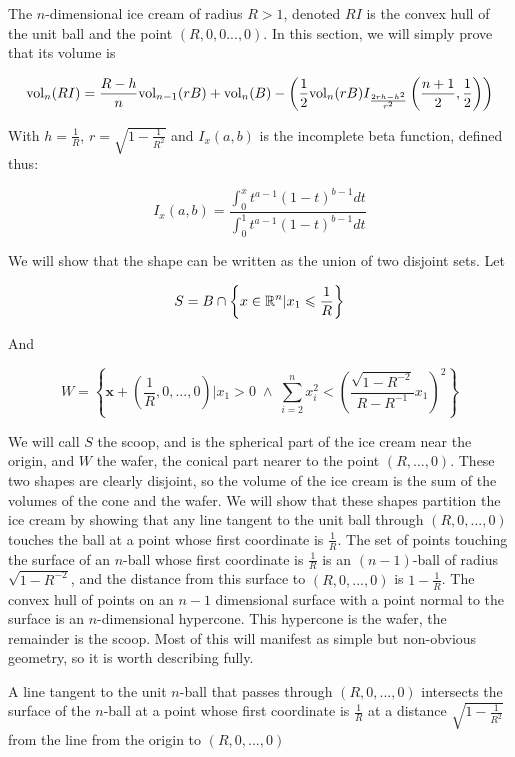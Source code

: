 The $n$-dimensional ice cream of radius $R>1$, denoted $RI$ is the convex hull of the unit ball and the point $(R,0,0...,0)$. In this section, we will simply prove that its volume is

$$
\mbox{vol}_n(RI) = \frac{R-h}{n} \mbox{vol}_{n-1}(rB) + \mbox{vol}_n(B) - \left(\frac{1}{2}\mbox{vol}_n(rB) I_{\frac{2rh-h^2}{r^2}}\left(\frac{n+1}{2}, \frac{1}{2}\right)\right)
$$

With $h = \frac{1}{R}$, $r = \sqrt{1-\frac{1}{R^2}}$ and $I_x(a,b)$ is the incomplete beta function, defined thus:

$$
I_x(a,b) = \frac{\int^x_0 t^{a-1}(1-t)^{b-1}dt}{\int^1_0 t^{a-1}(1-t)^{b-1} dt}
$$

We will show that the shape can be written as the union of two disjoint sets. Let

$$
S = B \cap \left\{{\bm x} \in \mathbb{R}^n | x_1 \leqslant \frac{1}{R}\right\}
$$

And

$$
W = \left\{{\bm x} + \left(\frac{1}{R}, 0, ..., 0\right) | x_1 > 0 \; \wedge \; \sum^{n}_{i=2} x_i^2 < \left(\frac{\sqrt{1-R^{-2}}}{R-R^{-1}} x_1\right)^2 \right\}
$$

We will call $S$ the scoop, and is the spherical part of the ice cream near the origin, and $W$ the wafer, the conical part nearer to the point $(R,...,0)$. These two shapes are clearly disjoint, so the volume of the ice cream is the sum of the volumes of the cone and the wafer. We will show that these shapes partition the ice cream by showing that any line tangent to the unit ball through $(R,0,...,0)$ touches the ball at a point whose first coordinate is $\frac{1}{R}$.  The set of points touching the surface of an $n$-ball whose first coordinate is $\frac{1}{R}$ is an $(n-1)$-ball of radius $\sqrt{1-R^{-2}}$, and the distance from this surface to $(R,0,...,0)$ is $1-\frac{1}{R}$. The convex hull of points on an $n-1$ dimensional surface with a point normal to the surface is an $n$-dimensional hypercone. This hypercone is the wafer, the remainder is the scoop. Most of this will manifest as simple but non-obvious geometry, so it is worth describing fully.

\begin{proposition}
A line tangent to the unit $n$-ball that passes through $(R,0,...,0)$ intersects the surface of the $n$-ball at a point whose first coordinate is $\frac{1}{R}$ at a distance $\sqrt{1-\frac{1}{R^2}}$ from the line from the origin to $(R,0,...,0)$
\end{proposition}

